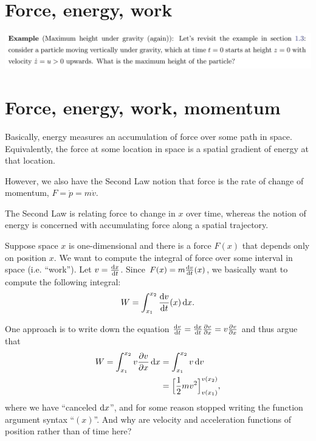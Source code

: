 \section{Force, energy, work}

\begin{mdframed}
  \includegraphics[width=400pt]{img/physics--classical-mechanics--oxford--dynamics--example--gravity.png}
\end{mdframed}

\section{Force, energy, work, momentum}

Basically, energy measures an accumulation of force over some path in space. Equivalently, the force
at some location in space is a spatial gradient of energy at that location.

However, we also have the Second Law notion that force is the rate of change of momentum,
$F = \dot{p} = m\dot{v}$.

The Second Law is relating force to change in $x$ over time, whereas the notion of energy is
concerned with accumulating force along a spatial trajectory.

Suppose space $x$ is one-dimensional and there is a force $F(x)$ that depends only on position
$x$. We want to compute the integral of force over some interval in space (i.e. ``work''). Let
$v = \dxdt$. Since $F(x) = m\dvdt(x)$, we basically want to compute the following integral:
\begin{align*}
  W = \int_{x_1}^{x_2} \dvdt(x) \dx.
\end{align*}

One approach is to write down the equation $\dvdt = \dxdt \dvdx = v\dvdx$ and thus argue that
\begin{align*}
  W
  = \int_{x_1}^{x_2} v\dvdx \dx
  &= \int_{x_1}^{x_2} v\d v \\
  &= \Big[\frac{1}{2}mv^2\Big]_{v(x_1)}^{v(x_2)},
\end{align*}
where we have ``canceled $\dx$'', and for some reason stopped writing the function argument syntax
``$(x)$''. And why are velocity and acceleration functions of position rather than of time here?

